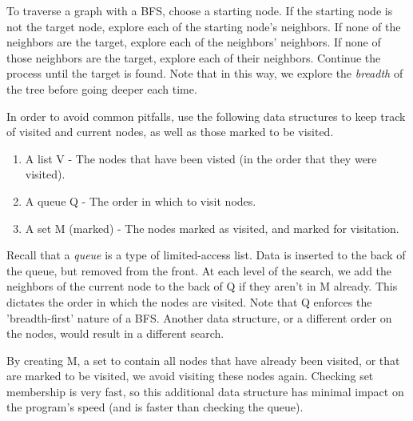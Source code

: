 To traverse a graph with a BFS, choose a starting node.
If the starting node is not the target node, explore each of the starting node's neighbors.
If none of the neighbors are the target, explore each of the neighbors' neighbors.
If none of those neighbors are the target, explore each of their neighbors.
Continue the process until the target is found.
Note that in this way, we explore the \emph{breadth} of the tree before going deeper each time.

In order to avoid common pitfalls, use the following data structures to keep track of visited and current nodes, as well as those marked to be visited.
\begin{enumerate}
  \item A list V - The nodes that have been visted (in the order that they were visited).
  \item A queue Q - The order in which to visit nodes.
  \item A set M (marked) - The nodes marked as visited, and marked for visitation.
\end{enumerate}

Recall that a \emph{queue} is a type of limited-access list.
Data is inserted to the back of the queue, but removed from the front.
At each level of the search, we add the neighbors of the current node to the back of Q if they aren't in M already.
This dictates the order in which the nodes are visited.
Note that Q enforces the 'breadth-first' nature of a BFS.
Another data structure, or a different order on the nodes, would result in a different search.

By creating M, a set to contain all nodes that have already been visited, or that are marked to be visited, we avoid visiting these nodes again.
Checking set membership is very fast, so this additional data structure has minimal impact on the program's speed (and is faster than checking the queue).

